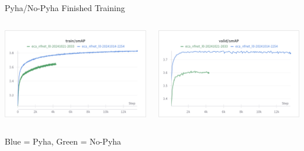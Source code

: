 \begin{frame}{Pyha/No-Pyha Finished Training}
    \begin{columns}
        \begin{column}{0.5\textwidth}
            \centering
            \includegraphics[height=0.5\textwidth]{images/train-smap-pnp.png}
        \end{column}
        \begin{column}{0.5\textwidth}
            \centering
            \includegraphics[height=0.5\textwidth]{images/valid-smap-pnp.png}
        \end{column}
    \end{columns}
    \centering
    Blue = Pyha, Green = No-Pyha
\end{frame}
